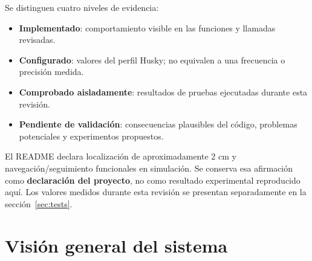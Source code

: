 \documentclass[11pt,a4paper]{article}
\begin{document}
Se distinguen cuatro niveles de evidencia:
\begin{itemize}
\item \textbf{Implementado}: comportamiento visible en las funciones y llamadas revisadas.
\item \textbf{Configurado}: valores del perfil Husky; no equivalen a una frecuencia o precisión medida.
\item \textbf{Comprobado aisladamente}: resultados de pruebas ejecutadas durante esta revisión.
\item \textbf{Pendiente de validación}: consecuencias plausibles del código, problemas potenciales y experimentos propuestos.
\end{itemize}

El README declara localización de aproximadamente 2 cm y navegación/seguimiento
funcionales en simulación. Se conserva esa afirmación como \textbf{declaración del
proyecto}, no como resultado experimental reproducido aquí. Los valores medidos
durante esta revisión se presentan separadamente en la sección~\ref{sec:tests}.
\cite{readme}

\section{Visión general del sistema}
\end{document}
